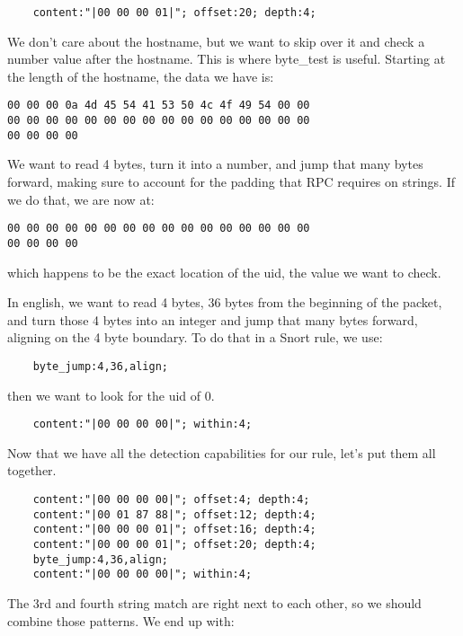\documentclass[english]{report}
\begin{document}
\begin{verbatim}
    content:"|00 00 00 01|"; offset:20; depth:4;
\end{verbatim}

We don't care about the hostname, but we want to skip over it and check a
number value after the hostname.  This is where byte\_test is useful.  Starting
at the length of the hostname, the data we have is:

\begin{verbatim}
00 00 00 0a 4d 45 54 41 53 50 4c 4f 49 54 00 00
00 00 00 00 00 00 00 00 00 00 00 00 00 00 00 00
00 00 00 00
\end{verbatim}

We want to read 4 bytes, turn it into a number, and jump that many bytes
forward, making sure to account for the padding that RPC requires on strings.
If we do that, we are now at:

\begin{verbatim}
00 00 00 00 00 00 00 00 00 00 00 00 00 00 00 00
00 00 00 00 
\end{verbatim}

which happens to be the exact location of the uid, the value we want to check.

In english, we want to read 4 bytes, 36 bytes from the beginning of the packet,
and turn those 4 bytes into an integer and jump that many bytes forward,
aligning on the 4 byte boundary.  To do that in a Snort rule, we use:

\begin{verbatim}
    byte_jump:4,36,align;
\end{verbatim}

then we want to look for the uid of 0.

\begin{verbatim}
    content:"|00 00 00 00|"; within:4;
\end{verbatim}

Now that we have all the detection capabilities for our rule, let's put them
all together.  

\begin{verbatim}
    content:"|00 00 00 00|"; offset:4; depth:4;
    content:"|00 01 87 88|"; offset:12; depth:4;
    content:"|00 00 00 01|"; offset:16; depth:4;
    content:"|00 00 00 01|"; offset:20; depth:4;
    byte_jump:4,36,align;
    content:"|00 00 00 00|"; within:4;
\end{verbatim}

The 3rd and fourth string match are right next to each other, so we should
combine those patterns.  We end up with:
\end{document}
